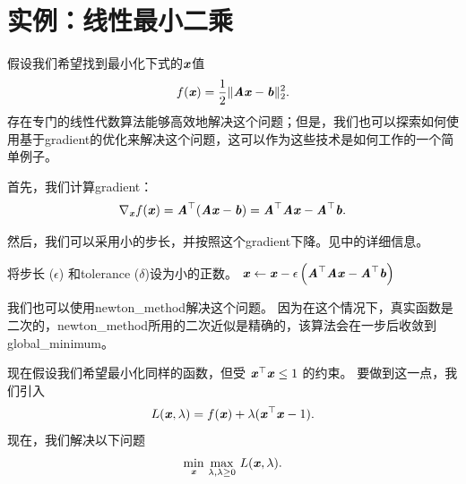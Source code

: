 
\section{实例：线性最小二乘}
\label{sec:example_linear_least_squares}
假设我们希望找到最小化下式的$\Vx$值
\begin{align}
 f(\Vx) = \frac{1}{2}\| \MA \Vx - \Vb \|_2^2 .
\end{align}
存在专门的线性代数算法能够高效地解决这个问题；但是，我们也可以探索如何使用基于\gls{gradient}的优化来解决这个问题，这可以作为这些技术是如何工作的一个简单例子。

首先，我们计算\gls{gradient}：
\begin{align}
 \nabla_{\Vx} f(\Vx) = \MA^\Tsp (\MA \Vx - \Vb) = \MA^\Tsp \MA \Vx - \MA^\Tsp \Vb .
\end{align}

然后，我们可以采用小的步长，并按照这个\gls{gradient}下降。见中的详细信息。

\begin{algorithm}[ht]
\caption{从任意点$\Vx$开始，使用\gls{GD}关于$\Vx$最小化
$ f(\Vx) = \frac{1}{2} || \MA \Vx - \Vb ||_2^2$的算法。
}
\label{alg:gdlsq}
\begin{algorithmic}
\STATE 将步长 ($\epsilon$) 和\gls{tolerance} ($\delta$)设为小的正数。
\STATE $\Vx \leftarrow \Vx - \epsilon \left( \MA^\top \MA \Vx - \MA^\top \Vb \right)$
\ENDWHILE
\end{algorithmic}
\end{algorithm}


我们也可以使用\gls{newton_method}解决这个问题。
因为在这个情况下，真实函数是二次的，\gls{newton_method}所用的二次近似是精确的，该算法会在一步后收敛到\gls{global_minimum}。

现在假设我们希望最小化同样的函数，但受 $\Vx^\Tsp \Vx \leq 1$ 的约束。 
要做到这一点，我们引入~
\begin{align}
 L(\Vx, \lambda) = f(\Vx) + \lambda (\Vx^\Tsp \Vx - 1).
\end{align}
现在，我们解决以下问题
\begin{align}
  \underset{\Vx}{\min}~
 \underset{\lambda, \lambda \geq 0}{\max}~ L(\Vx, \lambda) .
\end{align}


